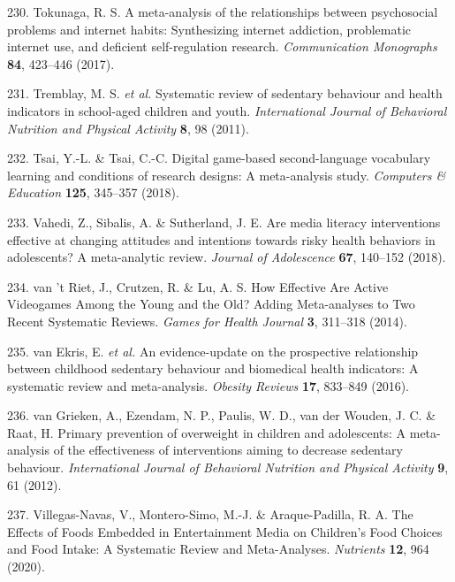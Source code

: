 \documentclass[
  english,
  man]{apa6}
\newenvironment{cslreferences}%
  {}%
  {\par}
\begin{document}
\begin{cslreferences}
\leavevmode\hypertarget{ref-tokunagaMetaanalysisRelationshipsPsychosocial2017}{}%
230. Tokunaga, R. S. A meta-analysis of the relationships between psychosocial problems and internet habits: Synthesizing internet addiction, problematic internet use, and deficient self-regulation research. \emph{Communication Monographs} \textbf{84}, 423--446 (2017).

\leavevmode\hypertarget{ref-tremblaySystematicReviewSedentary2011}{}%
231. Tremblay, M. S. \emph{et al.} Systematic review of sedentary behaviour and health indicators in school-aged children and youth. \emph{International Journal of Behavioral Nutrition and Physical Activity} \textbf{8}, 98 (2011).

\leavevmode\hypertarget{ref-tsaiDigitalGamebasedSecondlanguage2018}{}%
232. Tsai, Y.-L. \& Tsai, C.-C. Digital game-based second-language vocabulary learning and conditions of research designs: A meta-analysis study. \emph{Computers \& Education} \textbf{125}, 345--357 (2018).

\leavevmode\hypertarget{ref-vahediAreMediaLiteracy2018}{}%
233. Vahedi, Z., Sibalis, A. \& Sutherland, J. E. Are media literacy interventions effective at changing attitudes and intentions towards risky health behaviors in adolescents? A meta-analytic review. \emph{Journal of Adolescence} \textbf{67}, 140--152 (2018).

\leavevmode\hypertarget{ref-vantrietHowEffectiveAre2014}{}%
234. van 't Riet, J., Crutzen, R. \& Lu, A. S. How Effective Are Active Videogames Among the Young and the Old? Adding Meta-analyses to Two Recent Systematic Reviews. \emph{Games for Health Journal} \textbf{3}, 311--318 (2014).

\leavevmode\hypertarget{ref-vanekrisEvidenceupdateProspectiveRelationship2016}{}%
235. van Ekris, E. \emph{et al.} An evidence-update on the prospective relationship between childhood sedentary behaviour and biomedical health indicators: A systematic review and meta-analysis. \emph{Obesity Reviews} \textbf{17}, 833--849 (2016).

\leavevmode\hypertarget{ref-vangriekenPrimaryPreventionOverweight2012}{}%
236. van Grieken, A., Ezendam, N. P., Paulis, W. D., van der Wouden, J. C. \& Raat, H. Primary prevention of overweight in children and adolescents: A meta-analysis of the effectiveness of interventions aiming to decrease sedentary behaviour. \emph{International Journal of Behavioral Nutrition and Physical Activity} \textbf{9}, 61 (2012).

\leavevmode\hypertarget{ref-villegas-navasEffectsFoodsEmbedded2020}{}%
237. Villegas-Navas, V., Montero-Simo, M.-J. \& Araque-Padilla, R. A. The Effects of Foods Embedded in Entertainment Media on Children's Food Choices and Food Intake: A Systematic Review and Meta-Analyses. \emph{Nutrients} \textbf{12}, 964 (2020).


\end{cslreferences}
\end{document}

